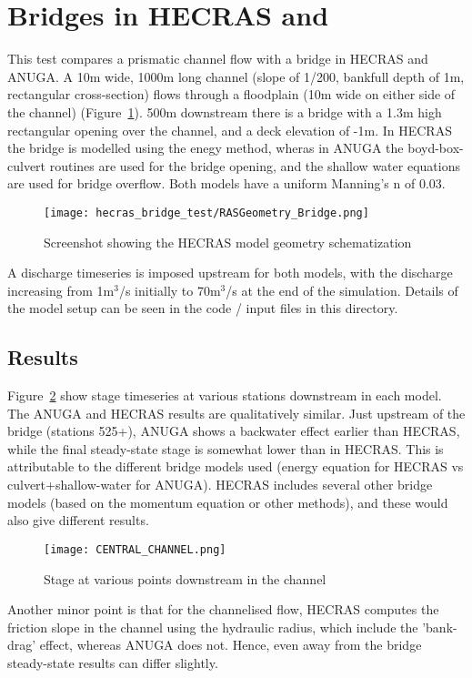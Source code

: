 \section{Bridges in HECRAS and \anuga{}}
This test compares a prismatic channel flow with a bridge in HECRAS and ANUGA.
A 10m wide, 1000m long channel (slope of 1/200, bankfull depth of 1m,
rectangular cross-section) flows through a floodplain (10m wide on either side
of the channel) (Figure~\ref{schematic}). 500m downstream there is a bridge
with a 1.3m high rectangular opening over the channel, and a deck elevation of
-1m. In HECRAS the bridge is modelled using the enegy method, wheras in ANUGA
the boyd-box-culvert routines are used for the bridge opening, and the shallow
water equations are used for bridge overflow. Both models have a uniform
Manning's n of 0.03. 

\begin{figure}
\begin{center}
\texttt{[image: hecras\_bridge\_test/RASGeometry\_Bridge.png]}
\end{center}
\caption{Screenshot showing the HECRAS model geometry schematization}
\label{schematic}
\end{figure}


A discharge timeseries is imposed upstream for both models, with the discharge
increasing from 1m$^3$/s initially to 70m$^3$/s at the end of the simulation.
Details of the model setup can be seen in the code / input files in this
directory.

\subsection{Results}

Figure~\ref{Reach} show stage timeseries at various stations downstream in each model.
The ANUGA and HECRAS results are qualitatively similar. Just upstream of the
bridge (stations 525+), ANUGA shows a backwater effect earlier than HECRAS,
while the final steady-state stage is somewhat lower than in HECRAS. This is
attributable to the different bridge models used (energy equation for HECRAS vs
culvert+shallow-water for ANUGA). HECRAS includes several other bridge models
(based on the momentum equation or other methods), and these would also give
different results. 

\begin{figure}
\begin{center}
\texttt{[image: CENTRAL\_CHANNEL.png]}
\end{center}
\caption{Stage at various points downstream in the channel}
\label{Reach}
\end{figure}

Another minor point is that for the channelised flow, HECRAS computes the
friction slope in the channel using the hydraulic radius, which include the
'bank-drag' effect, whereas ANUGA does not. Hence, even away from the bridge
steady-state results can differ slightly.

